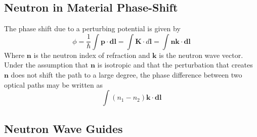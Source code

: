 \subsection{Neutron in Material Phase-Shift}
The phase shift due to a perturbing potential is given by \cite{green_2}
\begin{equation}
\phi = \frac{1}{\hbar}\int  \mathbf{p}\cdot \mathbf{dl} = \int \mathbf{K}\cdot d\mathbf{l}= \int \mathbf{nk}\cdot \mathbf{dl}
\label{phase_shift}
\end{equation}
Where $\mathbf{n}$ is the neutron index of refraction and $\mathbf{k}$ is the neutron wave vector. Under the assumption that $\mathbf{n}$ is isotropic and that the perturbation that creates $\mathbf{n}$ does not shift the path to a large degree, the phase difference between two optical paths may be written as
\begin{equation}
\int (n_1-n_2)\mathbf{k}\cdot \mathbf{dl}
\end{equation}
\subsection{Neutron Wave Guides}

